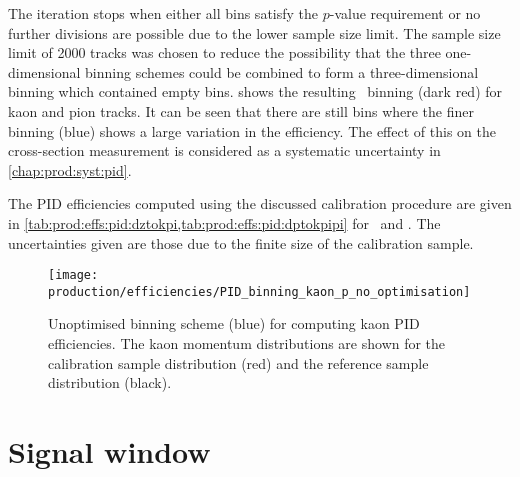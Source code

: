 The iteration stops when either all bins satisfy the $p$-value requirement or 
no further divisions are possible due to the lower sample size limit.
The sample size limit of 2000 tracks was chosen to reduce the possibility that 
the three one-dimensional binning schemes could be combined to form a 
three-dimensional binning which contained empty bins.
 shows the resulting 
\ptotetanspd\ binning (dark red) for kaon and pion tracks.
It can be seen that there are still bins where the finer binning (blue) shows a 
large variation in the efficiency.
The effect of this on the cross-section measurement is considered as a 
systematic uncertainty in \cref{chap:prod:syst:pid}.

The \acl{PID} efficiencies computed using the discussed calibration procedure 
are given in \cref{tab:prod:effs:pid:dztokpi,tab:prod:effs:pid:dptokpipi} for 
\DzToKpi\ and \DpToKpipi.
The uncertainties given are those due to the finite size of the calibration 
sample.

\begin{figure}
  \centering
  \texttt{[image: production/efficiencies/PID\_binning\_kaon\_p\_no\_optimisation]}
  \caption{%
    Unoptimised binning scheme (blue) for computing kaon \ac{PID} efficiencies.
    The kaon momentum distributions are shown for the calibration sample 
    distribution (red) and the reference sample distribution (black).
  }
  \label{fig:prod:effs:pid:binning:kaon_no_optimisation}
\end{figure}

\section{Signal window}
\label{chap:prod:effs:signal_window}

